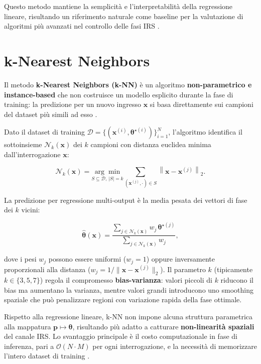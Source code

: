 \documentclass[12pt,a4paper]{report}
\begin{document}
Questo metodo mantiene la semplicità e l'interpretabilità della
regressione lineare, risultando un riferimento naturale come baseline
per la valutazione di algoritmi più avanzati nel controllo delle fasi IRS
\cite{hastie2009esl}.

\newpage
\section{k-Nearest Neighbors}
Il metodo \textbf{k-Nearest Neighbors (k-NN)} è un algoritmo
\textbf{non-parametrico e \newline instance-based} che non costruisce
un modello esplicito durante la fase di training: la predizione per
un nuovo ingresso $\mathbf{x}$ si basa direttamente sui campioni del
dataset più simili ad esso \cite{hastie2009esl}.

Dato il dataset di training $\mathcal{D} = \{(\mathbf{x}^{(i)},
\boldsymbol{\theta}^{\star(i)})\}_{i=1}^N$, l'algoritmo identifica il
sottoinsieme $\mathcal{N}_k(\mathbf{x})$ dei $k$ campioni con
distanza euclidea minima dall'interrogazione $\mathbf{x}$:

\begin{equation}
  \mathcal{N}_k(\mathbf{x}) = \underset{S \subseteq \mathcal{D},\,
  |S|=k}{\arg\min}
  \sum_{(\mathbf{x}^{(j)}, \cdot) \in S}
  \left\|\mathbf{x} - \mathbf{x}^{(j)}\right\|_2.
\end{equation}

La predizione per regressione multi-output è la media pesata dei
vettori di fase dei $k$ vicini:

\begin{equation}
  \hat{\boldsymbol{\theta}}(\mathbf{x}) =
  \frac{\sum_{j \in \mathcal{N}_k(\mathbf{x})} w_j\,
  \boldsymbol{\theta}^{\star(j)}}
  {\sum_{j \in \mathcal{N}_k(\mathbf{x})} w_j},
  \label{eq:knn_pred}
\end{equation}

dove i pesi $w_j$ possono essere uniformi ($w_j = 1$) oppure
inversamente proporzionali alla distanza ($w_j =
1/\|\mathbf{x}-\mathbf{x}^{(j)}\|_2$). Il parametro $k$ (tipicamente
$k \in \{3, 5, 7\}$) regola il compromesso \textbf{bias-varianza}:
valori piccoli di $k$ riducono il bias ma aumentano la varianza,
mentre valori grandi introducono uno smoothing spaziale che può
penalizzare regioni con variazione rapida della fase ottimale.

Rispetto alla regressione lineare, k-NN non impone alcuna struttura
parametrica alla mappatura $\mathbf{p} \mapsto \boldsymbol{\theta}$,
risultando più adatto a catturare \textbf{non-linearità spaziali} del
canale IRS. Lo svantaggio principale è il costo computazionale in
fase di inferenza, pari a $\mathcal{O}(N \cdot M)$ per ogni
interrogazione, e la necessità di memorizzare l'intero dataset di
training \cite{hastie2009esl}.
\end{document}
